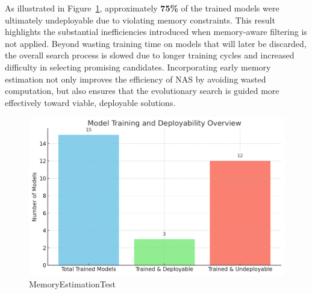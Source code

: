 As illustrated in Figure~\ref{fig:memoryEstimationTest}, approximately \textbf{75\%} of the trained models were ultimately undeployable due to violating memory constraints. This result highlights the substantial inefficiencies introduced when memory-aware filtering is not applied. Beyond wasting training time on models that will later be discarded, the overall search process is slowed due to longer training cycles and increased difficulty in selecting promising candidates. Incorporating early memory estimation not only improves the efficiency of NAS by avoiding wasted computation, but also ensures that the evolutionary search is guided more effectively toward viable, deployable solutions.

\clearpage

\begin{table}[ht]
\noindent %
\hspace*{-\oddsidemargin} %
\caption{Summary of two TakuNet models.}
\label{tab:taku_models}
\end{table}

\bigskip

\begin{figure}[ht]
    \centering
    \includegraphics[width=0.85\linewidth]{Pictures/MemoryEstimationTest.png}
    \caption{MemoryEstimationTest}
    \label{fig:memoryEstimationTest}
\end{figure}





